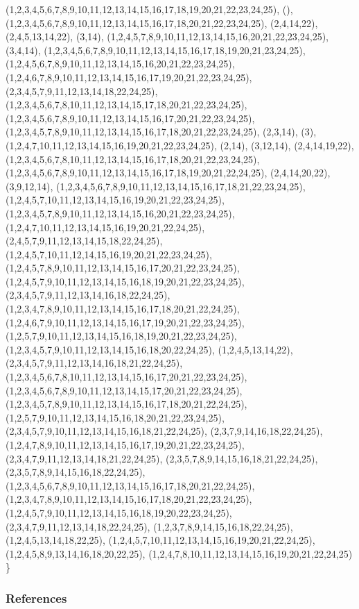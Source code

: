 \documentclass{beamer}
\begin{document}
\begin{frame}
\begin{table}[h]
{{        {(1,2,3,4,5,6,7,8,9,10,11,12,13,14,15,16,17,18,19,20,21,22,23,24,25), (), (1,2,3,4,5,6,7,8,9,10,11,12,13,14,15,16,17,18,20,21,22,23,24,25), (2,4,14,22), (2,4,5,13,14,22), (3,14), (1,2,4,5,7,8,9,10,11,12,13,14,15,16,20,21,22,23,24,25), (3,4,14), (1,2,3,4,5,6,7,8,9,10,11,12,13,14,15,16,17,18,19,20,21,23,24,25), (1,2,4,5,6,7,8,9,10,11,12,13,14,15,16,20,21,22,23,24,25), (1,2,4,6,7,8,9,10,11,12,13,14,15,16,17,19,20,21,22,23,24,25), (2,3,4,5,7,9,11,12,13,14,18,22,24,25), (1,2,3,4,5,6,7,8,10,11,12,13,14,15,17,18,20,21,22,23,24,25), (1,2,3,4,5,6,7,8,9,10,11,12,13,14,15,16,17,20,21,22,23,24,25), (1,2,3,4,5,7,8,9,10,11,12,13,14,15,16,17,18,20,21,22,23,24,25), (2,3,14), (3), (1,2,4,7,10,11,12,13,14,15,16,19,20,21,22,23,24,25), (2,14), (3,12,14), (2,4,14,19,22), (1,2,3,4,5,6,7,8,10,11,12,13,14,15,16,17,18,20,21,22,23,24,25), (1,2,3,4,5,6,7,8,9,10,11,12,13,14,15,16,17,18,19,20,21,22,24,25), (2,4,14,20,22), (3,9,12,14), (1,2,3,4,5,6,7,8,9,10,11,12,13,14,15,16,17,18,21,22,23,24,25), (1,2,4,5,7,10,11,12,13,14,15,16,19,20,21,22,23,24,25), (1,2,3,4,5,7,8,9,10,11,12,13,14,15,16,20,21,22,23,24,25), (1,2,4,7,10,11,12,13,14,15,16,19,20,21,22,24,25), (2,4,5,7,9,11,12,13,14,15,18,22,24,25), (1,2,4,5,7,10,11,12,14,15,16,19,20,21,22,23,24,25), (1,2,4,5,7,8,9,10,11,12,13,14,15,16,17,20,21,22,23,24,25), (1,2,4,5,7,9,10,11,12,13,14,15,16,18,19,20,21,22,23,24,25), (2,3,4,5,7,9,11,12,13,14,16,18,22,24,25), (1,2,3,4,7,8,9,10,11,12,13,14,15,16,17,18,20,21,22,24,25), (1,2,4,6,7,9,10,11,12,13,14,15,16,17,19,20,21,22,23,24,25), (1,2,5,7,9,10,11,12,13,14,15,16,18,19,20,21,22,23,24,25), (1,2,3,4,5,7,9,10,11,12,13,14,15,16,18,20,22,24,25), (1,2,4,5,13,14,22), (2,3,4,5,7,9,11,12,13,14,16,18,21,22,24,25), (1,2,3,4,5,6,7,8,10,11,12,13,14,15,16,17,20,21,22,23,24,25), (1,2,3,4,5,6,7,8,9,10,11,12,13,14,15,17,20,21,22,23,24,25), (1,2,3,4,5,7,8,9,10,11,12,13,14,15,16,17,18,20,21,22,24,25), (1,2,5,7,9,10,11,12,13,14,15,16,18,20,21,22,23,24,25), (2,3,4,5,7,9,10,11,12,13,14,15,16,18,21,22,24,25), (2,3,7,9,14,16,18,22,24,25), (1,2,4,7,8,9,10,11,12,13,14,15,16,17,19,20,21,22,23,24,25), (2,3,4,7,9,11,12,13,14,18,21,22,24,25), (2,3,5,7,8,9,14,15,16,18,21,22,24,25), (2,3,5,7,8,9,14,15,16,18,22,24,25), (1,2,3,4,5,6,7,8,9,10,11,12,13,14,15,16,17,18,20,21,22,24,25), (1,2,3,4,7,8,9,10,11,12,13,14,15,16,17,18,20,21,22,23,24,25), (1,2,4,5,7,9,10,11,12,13,14,15,16,18,19,20,22,23,24,25), (2,3,4,7,9,11,12,13,14,18,22,24,25), (1,2,3,7,8,9,14,15,16,18,22,24,25), (1,2,4,5,13,14,18,22,25), (1,2,4,5,7,10,11,12,13,14,15,16,19,20,21,22,24,25), (1,2,4,5,8,9,13,14,16,18,20,22,25), (1,2,4,7,8,10,11,12,13,14,15,16,19,20,21,22,24,25)}
        \}}}
  \end{table}
\end{frame}

\begin{frame}
  \frametitle{References}
  
  
\end{frame}
\end{document}

